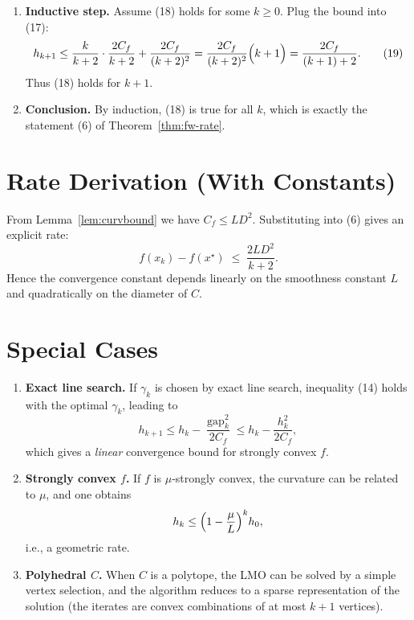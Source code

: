 \documentclass{article}
\newcommand{\gap}{\operatorname{gap}}
\begin{document}
\begin{enumerate}[label=[Step \arabic*],leftmargin=*]
\item \textbf{Inductive step.} Assume (18) holds for some $k\ge0$. Plug the bound into (17):
\[
h_{k+1}\le \frac{k}{k+2}\cdot\frac{2C_{f}}{k+2}
          +\frac{2C_{f}}{(k+2)^{2}}
        =\frac{2C_{f}}{(k+2)^{2}}\Bigl(k+1\Bigr)
        =\frac{2C_{f}}{(k+1)+2}.
\tag{19}
\]
Thus (18) holds for $k+1$.

\item \textbf{Conclusion.} By induction, (18) is true for all $k$, which is exactly the statement (6) of Theorem~\ref{thm:fw-rate}. \qedhere
\end{enumerate}

\section*{Rate Derivation (With Constants)}
From Lemma~\ref{lem:curvbound} we have $C_{f}\le L D^{2}$. Substituting into (6) gives an explicit rate:
\[
f(x_{k})-f(x^{\star})\;\le\;\frac{2L D^{2}}{k+2}.
\tag{20}
\]
Hence the convergence constant depends linearly on the smoothness constant $L$ and quadratically on the diameter of $C$.

\section*{Special Cases}
\begin{enumerate}
\item \textbf{Exact line search.} If $\gamma_{k}$ is chosen by exact line search, inequality (14) holds with the optimal $\gamma_{k}$, leading to
\[
h_{k+1}\le h_{k}-\frac{\gap_{k}^{2}}{2C_{f}}
\le h_{k}-\frac{h_{k}^{2}}{2C_{f}},
\]
which gives a \emph{linear} convergence bound for strongly convex $f$.
\item \textbf{Strongly convex $f$.} If $f$ is $\mu$‑strongly convex, the curvature can be related to $\mu$, and one obtains
\[
h_{k}\le \Bigl(1-\frac{\mu}{L}\Bigr)^{k}h_{0},
\]
i.e., a geometric rate.
\item \textbf{Polyhedral $C$.} When $C$ is a polytope, the LMO can be solved by a simple vertex selection, and the algorithm reduces to a sparse representation of the solution (the iterates are convex combinations of at most $k+1$ vertices).
\end{enumerate}
\end{document}
